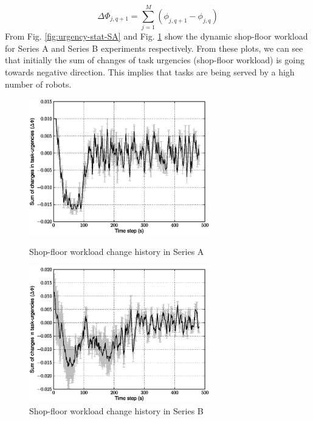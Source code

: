 \documentclass[smallcondensed]{svjour3}
\begin{document}
\begin{equation} 
\Delta \Phi_{j, q+1} = \sum_{j=1}^{M} (\phi_{j, q+1} - \phi_{j, q})
\label{eqn:Delta-Phi}
\end{equation}
From Fig. \ref{fig:urgency-stat-SA} and Fig. \ref{fig:urgency-stat-SB} show the dynamic shop-floor workload for Series A and Series B experiments respectively. From these plots, we can see that initially the sum of changes of task urgencies (shop-floor workload) is going towards negative direction. This implies that tasks are being served by a high number of robots. 
\begin{figure}
\centering
\includegraphics[width=0.7\textwidth, angle=0]
{images/global-8robots/8robots2tasks-TaskUrgencyStat.eps}
\caption{\small Shop-floor workload change history in Series A} 
\label{fig:urgency-stat-SA} %
\centering
\includegraphics[width=0.7\textwidth, angle=0]{images/TaskUrgencyStat.eps}
\caption{\small Shop-floor workload change history in Series B} %
\label{fig:urgency-stat-SB} %
\end{figure}
\end{document}
